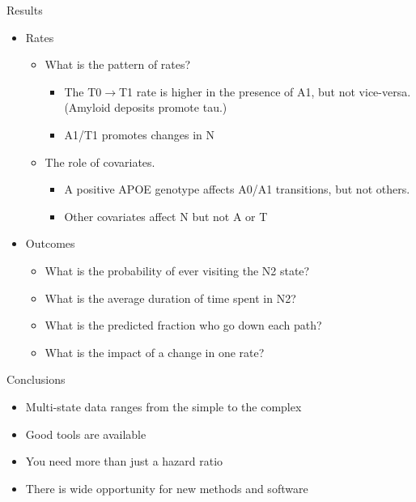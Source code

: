 \begin{frame}{Results}
  \begin{itemize}
    \item Rates
      \begin{itemize}
        \item What is the pattern of rates?
          \begin{itemize}
            \item The T0$\rightarrow$T1 rate is higher in the presence of
              A1, but not vice-versa.  (Amyloid deposits promote tau.)
            \item A1/T1 promotes changes in N
          \end{itemize}
        \item The role of covariates.
          \begin{itemize}
            \item A positive APOE genotype affects A0/A1 transitions, but
              not others.
            \item Other covariates affect N but not A or T
          \end{itemize}
      \end{itemize}
    \item Outcomes
      \begin{itemize}
        \item What is the probability of ever visiting the N2 state? 
          \item What is the average duration of time spent in N2?
          \item What is the predicted fraction who go down each path?
        \item What is the impact of a change in one rate?
      \end{itemize}
  \end{itemize}
\end{frame}

\begin{frame}{Conclusions}
  \begin{itemize}
    \item Multi-state data ranges from the simple to the complex
    \item Good tools are available
    \item You need more than just a hazard ratio
    \item There is wide opportunity for new methods and software
  \end{itemize}
\end{frame}

          
